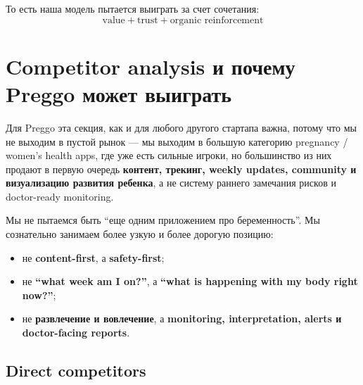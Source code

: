 \documentclass[10pt,a4paper]{article}
\begin{document}
То есть наша модель пытается выиграть за счет сочетания:
\[
\text{value} + \text{trust} + \text{organic reinforcement}
\]


\section{Competitor analysis и почему Preggo может выиграть}

Для Preggo эта секция, как и для любого другого стартапа важна, потому что мы не выходим в пустой рынок --- мы выходим в большую категорию pregnancy / women’s health apps, где уже есть сильные игроки, но большинство из них продают в первую очередь \textbf{контент, трекинг, weekly updates, community и визуализацию развития ребенка}, а не систему раннего замечания рисков и doctor-ready monitoring.

\newpage

\begin{softbox}
Мы не пытаемся быть ``еще одним приложением про беременность''.  
Мы сознательно занимаем более узкую и более дорогую позицию:

\begin{itemize}
    \item не \textbf{content-first}, а \textbf{safety-first};
    \item не \textbf{``what week am I on?''}, а \textbf{``what is happening with my body right now?''};
    \item не \textbf{развлечение и вовлечение}, а \textbf{monitoring, interpretation, alerts и doctor-facing reports}.
\end{itemize}
\end{softbox}

\subsection{Direct competitors}
\end{document}
